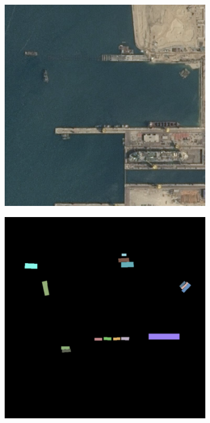 \begin{figure}[h]
    \newcommand{\CategoricalAccuracyImageWidth}{0.3\textwidth}

    \centering
    \hfill
    \begin{subfigure}{\CategoricalAccuracyImageWidth}
        \includegraphics[width=\textwidth]{images/categorical_accuracy_image}
        \caption{}
        \label{fig:ca_image}
    \end{subfigure}
    \hfill
    \begin{subfigure}{\CategoricalAccuracyImageWidth}
        \includegraphics[width=\textwidth]{images/categorical_accuracy_label}

\end{subfigure}
\end{figure}
